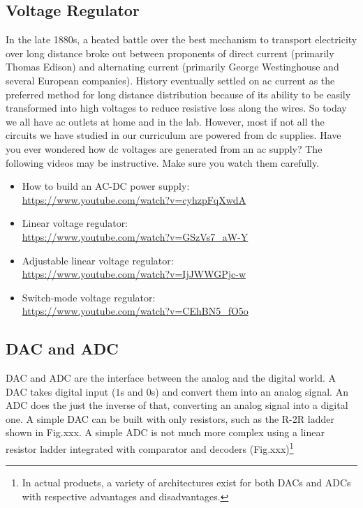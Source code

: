 \documentclass[letterpaper, 11pt]{article}
\begin{document}
\subsection{Voltage Regulator}
In the late 1880s, a heated battle over the best mechanism to transport electricity over long distance broke out between proponents of direct current (primarily Thomas Edison) and alternating current (primarily George Westinghouse and several European companies). History eventually settled on ac current as the preferred method for long distance distribution because of its ability to be easily transformed into high voltages to reduce resistive loss along the wires. So today we all have ac outlets at home and in the lab. However, most if not all the circuits we have studied in our curriculum are powered from dc supplies. Have you ever wondered how dc voltages are generated from an ac supply? The following videos may be instructive. Make sure you watch them carefully. 

\begin{itemize}[itemsep=0.1ex]
	\item How to build an AC-DC power supply:\\ \url{https://www.youtube.com/watch?v=cyhzpFqXwdA} 
	\item Linear voltage regulator:\\ \url{https://www.youtube.com/watch?v=GSzVs7_aW-Y}
	\item Adjustable linear voltage regulator:\\  \url{https://www.youtube.com/watch?v=IjJWWGPjc-w}
	\item Switch-mode voltage regulator:\\ \url{https://www.youtube.com/watch?v=CEhBN5_fO5o}
\end{itemize}

\subsection{DAC and ADC}

DAC and ADC are the interface between the analog and the digital world. A DAC takes digital input ($1$s and $0$s) and convert them into an analog signal. An ADC does the just the inverse of that, converting an analog signal into a digital one. A simple DAC can be built with only resistors, such as the R-2R ladder shown in Fig.xxx. A simple ADC is not much more complex using a linear resistor ladder integrated with comparator and decoders (Fig.xxx)\footnote{In actual products, a variety of architectures exist for both DACs and ADCs with respective advantages and disadvantages.}
\end{document}
